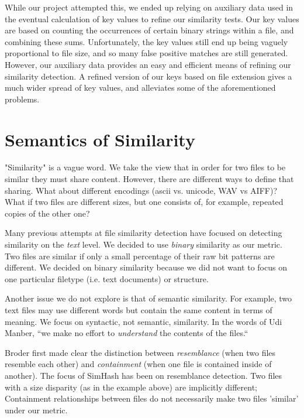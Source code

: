 \documentclass[10pt, twocolumn]{article}
\begin{document}
While our project attempted this, we ended up relying on auxiliary data used in the eventual calculation of key values to refine our similarity tests.  Our key values are based on counting the occurrences of certain binary strings within a file, and combining these sums.  Unfortunately, the key values still end up being vaguely proportional to file size, and so many false positive matches are still generated.  However, our auxiliary data provides an easy and efficient means of refining our similarity detection.  A refined version of our keys based on file extension gives a much wider spread of key values, and alleviates some of the aforementioned problems.

\section{Semantics of Similarity}

"Similarity" is a vague word. We take the view that in order for two files to be similar they must share content. However, there are different ways to define that sharing. What about different encodings (ascii vs. unicode, WAV vs AIFF)? What if two files are different sizes, but one consists of, for example, repeated copies of the other one? 

Many previous attempts at file similarity detection have focused on detecting similarity on the \emph{text} \cite{hpDocRepositories, hoad} level. We decided to use \emph{binary} similarity as our metric. Two files are similar if only a small percentage of their raw bit patterns are different. We decided on binary similarity because we did not want to focus on one particular filetype (i.e. text documents) or structure. 

Another issue we do not explore is that of semantic similarity. For example, two text files may use different words but contain the same content in terms of meaning. We focus on syntactic, not semantic, similarity. In the words of Udi Manber, ``we make no effort to \emph{understand} the contents of the files.`` \cite{manber}

Broder \cite{broder} first made clear the distinction between \emph{resemblance} (when two files resemble each other) and \emph{containment} (when one file is contained inside of another). The focus of SimHash has been on resemblance detection. Two files with a size disparity (as in the example above) are implicitly different; Containment relationships between files do not necessarily make two files 'similar' under our metric.
\end{document}
